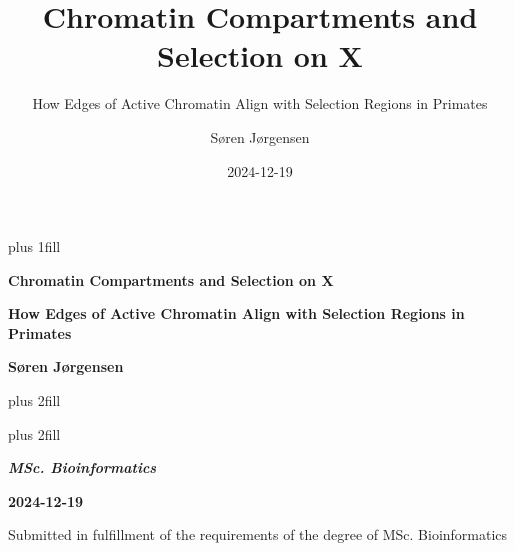 \documentclass[
  11pt,
  a4paper,
]{scrbook}
\title{Chromatin Compartments and Selection on X}
\subtitle{How Edges of Active Chromatin Align with Selection Regions in
Primates}
\author{Søren Jørgensen}
\date{2024-12-19}
\begin{document}
\frontmatter
\cleardoublepage
\thispagestyle{empty}
{\centering
\hbox{}\vskip 0cm plus 1fill

{%
\Huge\bfseries Chromatin Compartments and Selection on X \par}
\vspace{3ex}
{\Large\bfseries How Edges of Active Chromatin Align with Selection
Regions in Primates \par}
\vspace{6ex}

    {\Large\bfseries Søren Jørgensen \par}
%
\vskip 0cm plus 2fill

{ \par}
\vskip 0cm plus 2fill

{\bfseries\Large\textit{MSc. Bioinformatics} \par}
\vspace{3ex}

{\bfseries\large 2024-12-19 \par}
\vspace{3ex}

\vspace{12ex}
{\small Submitted in fulfillment of the requirements
of the degree of MSc. Bioinformatics \par}
\pagebreak

}
\end{document}
